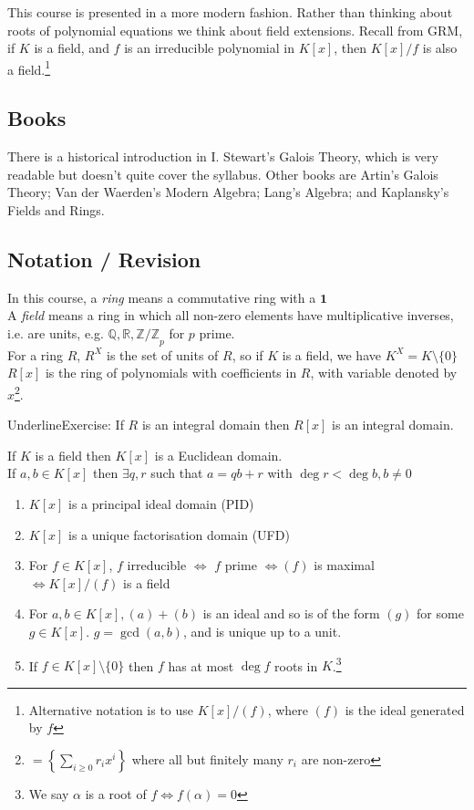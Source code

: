 \documentclass[a4paper, 10pt, twocolumn]{amsart}
\begin{document}
This course is presented in a more modern fashion. Rather than thinking about roots of polynomial equations we think about field extensions. Recall from GRM, if $K$ is a field, and $f$ is an irreducible polynomial in $K[x]$, then $K[x]/f$ is also a field.\footnote{Alternative notation is to use $K[x]/(f)$, where $(f)$ is the ideal generated by $f$}

\subsection*{Books}
There is a historical introduction in I. Stewart's Galois Theory, which is very readable but doesn't quite cover the syllabus. Other books are Artin's Galois Theory; Van der Waerden's Modern Algebra; Lang's Algebra; and Kaplansky's Fields and Rings.

\subsection*{Notation / Revision}
In this course, a \emph{ring} means a commutative ring with a $\mathbf{1}$\\
A \emph{field} means a ring in which all non-zero elements have multiplicative inverses, i.e. are units, e.g. $\mathbb{Q, R, Z/Z}_p$ for $p$ prime.\\
For a ring $R$, $R^{X}$ is the set of units of $R$, so if $K$ is a field, we have $K^{X} = K\setminus\{0\}$\\
$R[x]$ is the ring of polynomials with coefficients in $R$, with variable denoted by $x$\footnote{$ = \left\{ \sum_{i\geq 0} r_i x^i\right\}$ where all but finitely many $r_i$ are non-zero}.

Underline{Exercise:} If $R$ is an integral domain then $R[x]$ is an integral domain.

If $K$ is a field then $K[x]$ is a Euclidean domain.\\
If $a,b \in K[x]$ then $\exists q,r$ such that $a = qb + r$ with $\deg r < \deg b, b \neq 0$

\begin{corollary}
\item
\begin{enumerate}
\item $K[x]$ is a principal ideal domain (PID)
\item $K[x]$ is a unique factorisation domain (UFD)
\item For $f \in K[x]$, $f$ irreducible $\iff$ $f$ prime $\iff (f)$ is maximal $\iff K[x]/(f)$ is a field
\item For $a, b \in K[x], (a)+(b)$ is an ideal and so is of the form $(g)$ for some $g \in K[x]$. $g = \gcd(a,b)$, and is unique up to a unit.
\item If $f\in K[x]\setminus\{0\}$ then $f$ has at most $\deg f$ roots in $K$.\footnote{We say $\alpha$ is a root of $f \iff f(\alpha) = 0$}
\end{enumerate}
\end{corollary}
\end{document}
